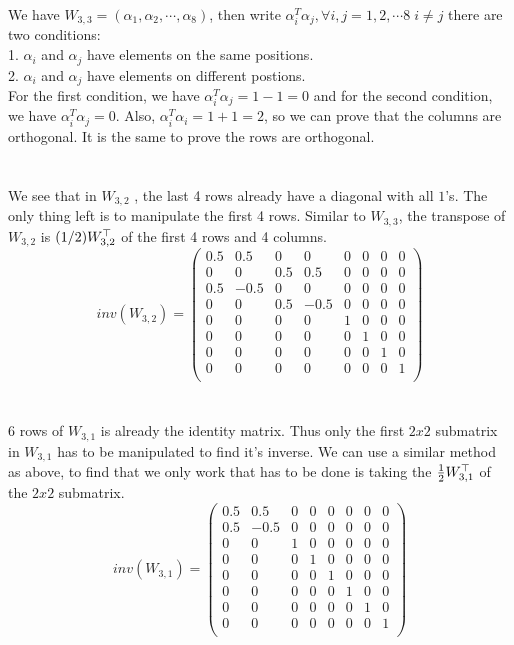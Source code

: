 \documentclass[12pt]{article}
\begin{document}
We have $W_{3, 3} = (\alpha_1, \alpha_2, \cdots, \alpha_8)$, then write $\alpha_i^T\alpha_j, \forall i,j = 1,2,\cdots8 \; i \neq j$ there are two conditions: \\
1. $\alpha_i$ and $\alpha_j$ have elements on the same positions. \\ 
2. $\alpha_i$ and $\alpha_j$ have elements on different postions. \\
For the first condition, we have $\alpha_i^T\alpha_j = 1-1=0$ and for the second condition, we have $\alpha_i^T\alpha_j = 0$. Also, $\alpha_i^T\alpha_i = 1 + 1 = 2$, so we can prove that the columns are orthogonal. It
is the same to prove the rows are orthogonal. \\
\\
\\
We see that in $W_{3, 2}$ , the last 4 rows already have a diagonal with all $1$'s. The only thing left is to manipulate the first 4 rows. Similar to $W_{3,3}$, the transpose of $W_{3, 2}$ is $(1/2) W_{3, 2}^{\top}$ of the first 4 rows and 4 columns.\\
\[
inv(W_{3, 2}) = 
\begin{pmatrix}
0.5  &  0.5  &  0 & 0 & 0   &  0   & 0    & 0  \\
0  &  0  &  0.5 & 0.5 & 0 &  0   & 0    & 0  \\
0.5   &  -0.5  &  0 & 0 &  0  & 0   & 0    & 0  \\
0   &  0  &  0.5 & -0.5 &  0  & 0 & 0    & 0  \\
0   &  0  &  0 & 0 &  1  &  0 & 0    & 0  \\
0   &  0  &  0 & 0 &  0  &  1 & 0  & 0  \\
0   &  0  &  0 & 0 &  0  &  0  & 1    & 0  \\
0   &  0  &  0 & 0 &  0  &  0  & 0    & 1 \\
\end{pmatrix}
\]
\\
\\
6 rows of $W_{3, 1}$ is already the identity matrix. Thus only the first $2x2$ submatrix in $W_{3, 1}$ has to be manipulated to find it's inverse. We can use a similar method as above, to find that we only work that has to be done is taking the $\frac{1}{2} W_{3, 1}^{\top}$ of the $2x2$ submatrix. \\
\[
inv(W_{3, 1}) = 
\begin{pmatrix}
0.5  &  0.5  &  0 & 0 & 0   &  0   & 0    & 0  \\
0.5 &  -0.5  &  0 & 0 & 0 &  0   & 0    & 0  \\
0   &  0  &  1 & 0 &  0  & 0   & 0    & 0  \\
0   &  0  &  0 & 1 &  0  & 0 & 0    & 0  \\
0   &  0  &  0 & 0 &  1  &  0 & 0    & 0  \\
0   &  0  &  0 & 0 &  0  &  1 & 0  & 0  \\
0   &  0  &  0 & 0 &  0  &  0  & 1    & 0  \\
0   &  0  &  0 & 0 &  0  &  0  & 0    & 1 \\
\end{pmatrix}
\]
\\
\end{document}
